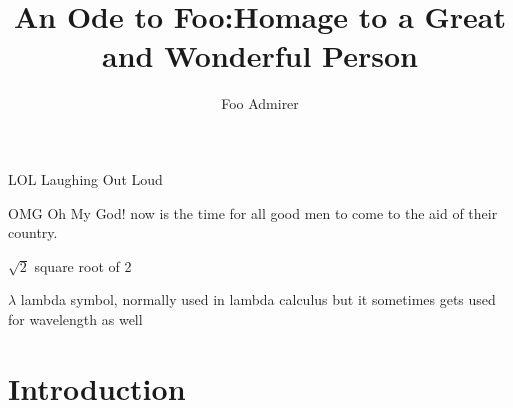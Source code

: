 \documentclass[proposal]{bsu-ms}
\title{An Ode to Foo:\titleBreak Homage to a Great and Wonderful Person}
\author{Foo Admirer}
\begin{document}
\frontmatter  %

\buildFrontPages %

\begin{listAbbreviations}
  \item[LOL] Laughing Out Loud
  \item[OMG] Oh My God! now is the time for all good men to come to the
    aid of their country.
\end{listAbbreviations}


\begin{listSymbols}
  \item[$\sqrt{2}$] square root of 2
  \item[$\lambda$] lambda symbol, normally used in lambda calculus but
    it sometimes gets used for wavelength as well
\end{listSymbols}



\mainmatter


%
%

\chapter{Introduction}

%
%
\end{document}

